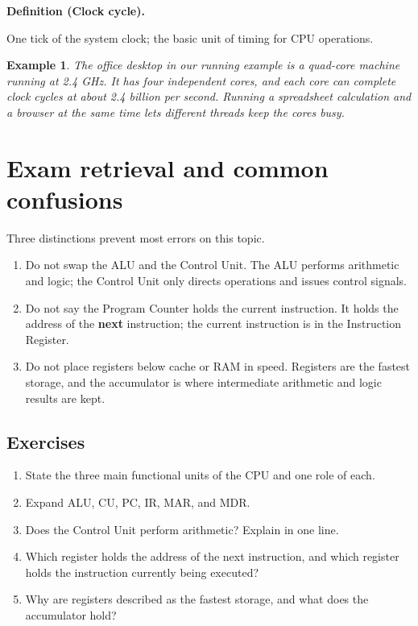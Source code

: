 \documentclass[11pt]{article}
\newtheorem{example}{Example}[section]
\newenvironment{definitionbox}[1]{%
  \par\noindent\textbf{Definition (#1).}\ \itshape
}{\par\vspace{0.3em}}
\begin{document}
\begin{definitionbox}{Clock cycle}
One tick of the system clock; the basic unit of timing for CPU operations.
\end{definitionbox}

\begin{example}
The office desktop in our running example is a quad-core machine running at
2.4 GHz. It has four independent cores, and each core can complete clock
cycles at about 2.4 billion per second. Running a spreadsheet calculation and
a browser at the same time lets different threads keep the cores busy.
\end{example}

\section{Exam retrieval and common confusions}
Three distinctions prevent most errors on this topic.
\begin{enumerate}
  \item Do not swap the ALU and the Control Unit. The ALU performs
    arithmetic and logic; the Control Unit only directs operations and
    issues control signals.
  \item Do not say the Program Counter holds the current instruction. It
    holds the address of the \textbf{next} instruction; the current
    instruction is in the Instruction Register.
  \item Do not place registers below cache or RAM in speed. Registers are
    the fastest storage, and the accumulator is where intermediate
    arithmetic and logic results are kept.
\end{enumerate}

\subsection*{Exercises}
\begin{enumerate}[label=\arabic*.]
  \item State the three main functional units of the CPU and one role of
    each.
  \item Expand ALU, CU, PC, IR, MAR, and MDR.
  \item Does the Control Unit perform arithmetic? Explain in one line.
  \item Which register holds the address of the next instruction, and which
    register holds the instruction currently being executed?
  \item Why are registers described as the fastest storage, and what does
    the accumulator hold?
\end{enumerate}
\end{document}
